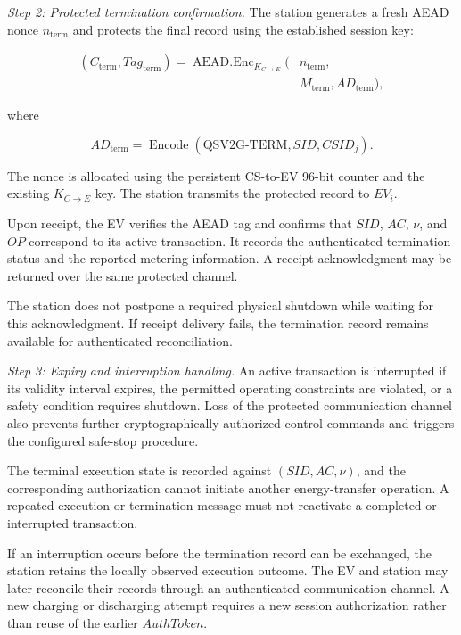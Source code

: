 \documentclass[twocolumn,10pt,journal]{IEEEtran}
\begin{document}
\textit{Step 2: Protected termination confirmation.}
The station generates a fresh AEAD nonce
$n_{\mathrm{term}}$ and protects the final record
using the established session key:

\begin{equation}
\begin{aligned}
(C_{\mathrm{term}},Tag_{\mathrm{term}})
=
\operatorname{AEAD.Enc}_{K_{C\to E}}\big(
&n_{\mathrm{term}},\\
&M_{\mathrm{term}},
AD_{\mathrm{term}}
\big),
\end{aligned}
\label{eq:qsv2g_termination_protection}
\end{equation}

where

\begin{equation}
AD_{\mathrm{term}}=
\operatorname{Encode}
(\mathrm{QSV2G\mbox{-}TERM},SID,CSID_j).
\label{eq:qsv2g_termination_ad}
\end{equation}

The nonce is allocated using the persistent CS-to-EV
96-bit counter and the existing $K_{C\to E}$ key.
The station transmits the protected record
to $EV_i$.

Upon receipt, the EV verifies the AEAD tag
and confirms that $SID$, $AC$, $\nu$, and
$OP$ correspond to its active transaction.
It records the authenticated termination
status and the reported metering information.
A receipt acknowledgment may be returned
over the same protected channel.

The station does not postpone a required
physical shutdown while waiting for this
acknowledgment. If receipt delivery fails,
the termination record remains available
for authenticated reconciliation.

\textit{Step 3: Expiry and interruption handling.}
An active transaction is interrupted if its
validity interval expires, the permitted
operating constraints are violated, or a
safety condition requires shutdown.
Loss of the protected communication channel
also prevents further cryptographically
authorized control commands and triggers
the configured safe-stop procedure.

The terminal execution state is recorded
against $(SID,AC,\nu)$, and the corresponding
authorization cannot initiate another
energy-transfer operation. A repeated
execution or termination message must not
reactivate a completed or interrupted
transaction.

If an interruption occurs before the
termination record can be exchanged, the
station retains the locally observed
execution outcome. The EV and station may
later reconcile their records through an
authenticated communication channel.
A new charging or discharging attempt
requires a new session authorization rather
than reuse of the earlier $AuthToken$.
\end{document}
